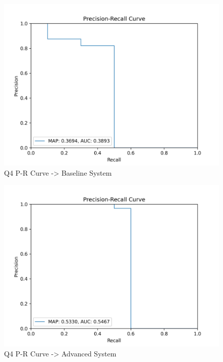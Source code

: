 \documentclass[sigconf]{acmart}
\begin{document}
\begin{figure}[H]
  \centering
  \includegraphics[width=0.8\linewidth]{precision_recall_q4b.png}
  \caption{Q4 P-R Curve -> Baseline System}
  \label{fig:precisionRecallBaseline4}
\end{figure}

\begin{figure}[H]
  \centering
  \includegraphics[width=0.8\linewidth]{precision_recall_q4a.png}
  \caption{Q4 P-R Curve -> Advanced System}
  \label{fig:precisionRecallAdvanced4}
\end{figure}

\end{document}
